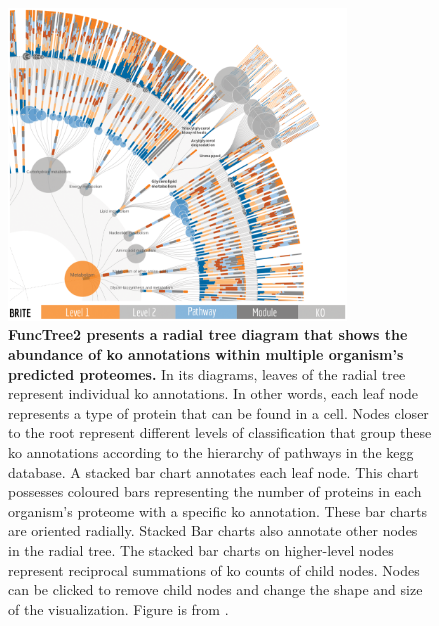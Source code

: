 \begin{figure}[!ht]
  \centering
	\includegraphics[width=0.8\textwidth]{media/functree2.png}
	 \caption[FuncTree2 presents a radial tree diagram that shows the abundance of KO annotations within multiple organism's predicted proteomes.]{\textbf{FuncTree2 presents a radial tree diagram that shows the abundance of \gls{ko} annotations within multiple organism's predicted proteomes.} In its diagrams, leaves of the radial tree represent individual \gls{ko} annotations. In other words, each leaf node represents a type of protein that can be found in a cell. Nodes closer to the root represent different levels of classification that group these \gls{ko} annotations according to the hierarchy of pathways in the \gls{kegg} database. A stacked bar chart annotates each leaf node. This chart possesses coloured bars representing the number of proteins in each organism's proteome with a specific \gls{ko}  annotation. These bar charts are oriented radially. Stacked Bar charts also annotate other nodes in the radial tree. The stacked bar charts on higher-level nodes represent reciprocal summations of \gls{ko} counts of child nodes. Nodes can be clicked to remove child nodes and change the shape and size of the visualization. Figure is from \cite{darzi2019functree2}.}
	 \label{fig:functree2}
\end{figure}


